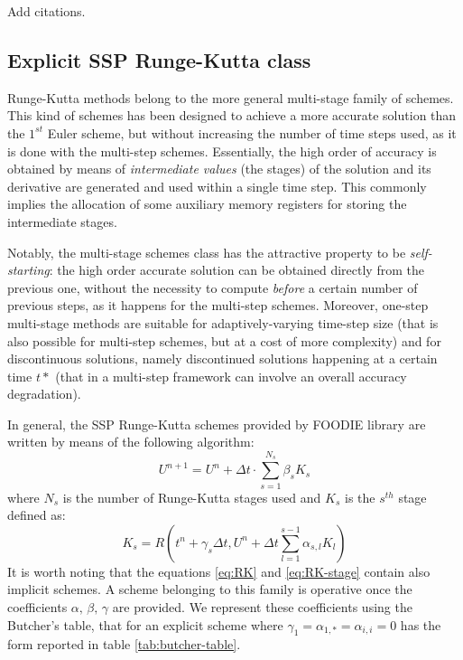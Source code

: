 {\color{red} Add citations.}

\subsection{Explicit SSP Runge-Kutta class}

Runge-Kutta methods belong to the more general multi-stage family of schemes. This kind of schemes has been designed to achieve a more accurate solution than the $1^{st}$ Euler scheme, but without increasing the number of time steps used, as it is done with the multi-step schemes. Essentially, the high order of accuracy is obtained by means of \emph{intermediate values} (the stages) of the solution and its derivative are generated and used within a single time step. This commonly implies the allocation of some auxiliary memory registers for storing the intermediate stages.

Notably, the multi-stage schemes class has the attractive property to be \emph{self-starting}: the high order accurate solution can be obtained directly from the previous one, without the necessity to compute \emph{before} a certain number of previous steps, as it happens for the multi-step schemes. Moreover, one-step multi-stage methods are suitable for adaptively-varying time-step size (that is also possible for multi-step schemes, but at a cost of more complexity) and for discontinuous solutions, namely discontinued solutions happening at a certain time $t*$ (that in a multi-step framework can involve an overall accuracy degradation).

In general, the SSP Runge-Kutta schemes provided by FOODIE library are written by means of the following algorithm:
\begin{equation}
  U^{n+1} = U^{n} + \Delta t \cdot\sum\limits_{s=1}^{N_{s}}{\beta_s K_s}
\label{eq:RK}
\end{equation}
where $N_s$ is the number of Runge-Kutta stages used and $K_s$ is the $s^{th}$ stage defined as:
\begin{equation}
  K_s = R\left(t^n + \gamma_s \Delta t, U^n+\Delta t\sum\limits_{l=1}^{s-1}{\alpha_{s,l} K_l} \right)
\label{eq:RK-stage}
\end{equation}
It is worth noting that the equations \ref{eq:RK} and \ref{eq:RK-stage} contain also implicit schemes. A scheme belonging to this family is operative once the coefficients $\alpha,\, \beta,\, \gamma$ are provided. We represent these coefficients using the Butcher's table, that for an explicit scheme where $\gamma_1=\alpha_{1,*}=\alpha_{i,i}=0$ has the form reported in table \ref{tab:butcher-table}.

